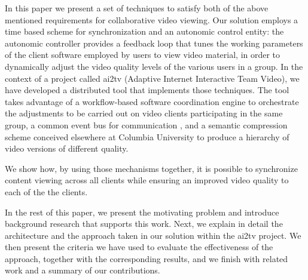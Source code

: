 \documentclass{sig-alternate}
\begin{document}
In this paper we present a set of techniques to satisfy both of the
above mentioned requirements for collaborative video viewing. Our
solution employs a time based scheme for synchronization and an
autonomic control entity: the autonomic controller provides a feedback
loop that tunes the working parameters of the client software employed
by users to view video material, in order to dynamically adjust the
video quality levels of the various users in a group.  In the context
of a project called ai2tv (Adaptive Internet Interactive Team Video),
we have developed a distributed tool that implements those techniques.
The tool takes advantage of a workflow-based software coordination
engine \cite{PEPPO} to orchestrate the adjustments to be carried out
on video clients participating in the same group, a common event bus
for communication \cite{Siena}, and a semantic compression scheme
conceived elsewhere at Columbia University \cite{TIECHENG} to produce
a hierarchy of video versions of different quality.

We show how, by using those mechanisms together, it is possible to
synchronize content viewing across all clients while ensuring an
improved video quality to each of the the clients.

In the rest of this paper, we present the motivating problem and
introduce background research that supports this work.  Next, we
explain in detail the architecture and the approach taken in our
solution within the ai2tv project.  We then present the criteria we
have used to evaluate the effectiveness of the approach, together with
the corresponding results, and we finish with related work and a
summary of our contributions.
\end{document}
